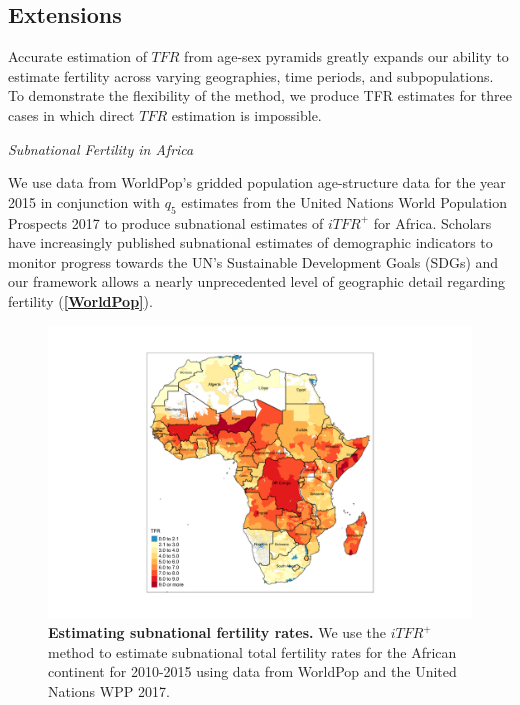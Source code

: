 \documentclass[12pt]{article}
\begin{document}
\hypertarget{sec:extensions}{%
\subsection{Extensions}\label{sec:extensions}}

Accurate estimation of \(TFR\) from age-sex pyramids greatly expands our
ability to estimate fertility across varying geographies, time periods,
and subpopulations. To demonstrate the flexibility of the method, we
produce TFR estimates for three cases in which direct \(TFR\) estimation
is impossible.

\emph{Subnational Fertility in Africa}

We use data from WorldPop's gridded population age-structure data for
the year 2015 \citep{tatem2013millennium} in conjunction with \(q_5\)
estimates from the United Nations World Population Prospects 2017
\citep{united2017world} to produce subnational estimates of \(iTFR^+\)
for Africa. Scholars have increasingly published subnational estimates
of demographic indicators to monitor progress towards the UN's
Sustainable Development Goals (SDGs)
\citep{osgood2018mapping, golding2017mapping, graetz2018mapping} and our
framework allows a nearly unprecedented level of geographic detail
regarding fertility (\textbf{\autoref{WorldPop}}).

\begin{figure}
\centering
\includegraphics{manuscript_files/figure-latex/plot-africa-map-1.png}
\caption{\textbf{Estimating subnational fertility rates.} We use the
\(iTFR^+\) method to estimate subnational total fertility rates for the
African continent for 2010-2015 using data from WorldPop and the United
Nations WPP 2017. \label{WorldPop}}
\end{figure}
\end{document}
